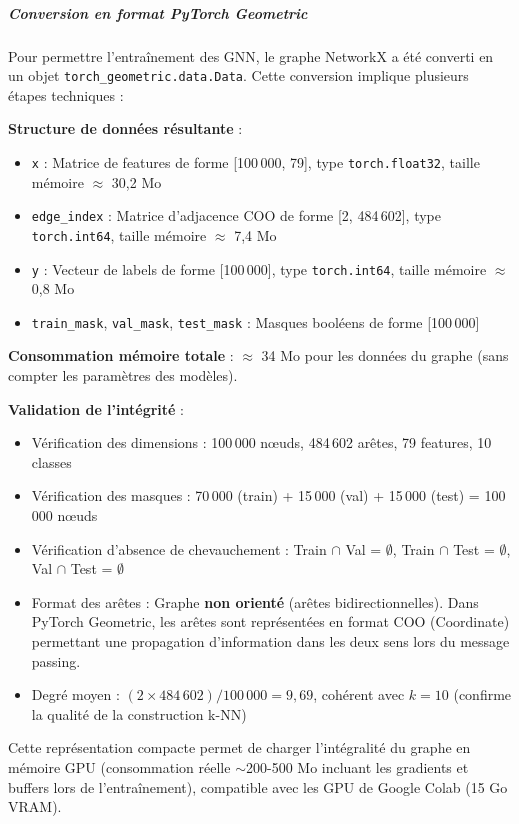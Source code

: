 ﻿\documentclass[11pt,a4paper]{article}
\begin{document}
\subparagraph{Conversion en format PyTorch Geometric}

Pour permettre l'entraînement des GNN, le graphe NetworkX a été converti en un objet \texttt{torch\_geometric.data.Data}. Cette conversion implique plusieurs étapes techniques :

\textbf{Structure de données résultante} :
\begin{itemize}
    \item \texttt{x} : Matrice de features de forme [100\,000, 79], type \texttt{torch.float32}, taille mémoire $\approx$ 30,2 Mo
    \item \texttt{edge\_index} : Matrice d'adjacence COO de forme [2, 484\,602], type \texttt{torch.int64}, taille mémoire $\approx$ 7,4 Mo
    \item \texttt{y} : Vecteur de labels de forme [100\,000], type \texttt{torch.int64}, taille mémoire $\approx$ 0,8 Mo
    \item \texttt{train\_mask}, \texttt{val\_mask}, \texttt{test\_mask} : Masques booléens de forme [100\,000]
\end{itemize}

\textbf{Consommation mémoire totale} : $\approx$ 34 Mo pour les données du graphe (sans compter les paramètres des modèles).

\textbf{Validation de l'intégrité} :
\begin{itemize}
    \item Vérification des dimensions : 100\,000 nœuds, 484\,602 arêtes, 79 features, 10 classes
    \item Vérification des masques : 70\,000 (train) + 15\,000 (val) + 15\,000 (test) = 100\,000 nœuds
    \item Vérification d'absence de chevauchement : Train $\cap$ Val = $\emptyset$, Train $\cap$ Test = $\emptyset$, Val $\cap$ Test = $\emptyset$
    \item Format des arêtes : Graphe \textbf{non orienté} (arêtes bidirectionnelles). Dans PyTorch Geometric, les arêtes sont représentées en format COO (Coordinate) permettant une propagation d'information dans les deux sens lors du message passing.
    \item Degré moyen : $(2 \times 484\,602) / 100\,000 = 9{,}69$, cohérent avec $k = 10$ (confirme la qualité de la construction k-NN)
\end{itemize}

Cette représentation compacte permet de charger l'intégralité du graphe en mémoire GPU (consommation réelle $\sim$200-500 Mo incluant les gradients et buffers lors de l'entraînement), compatible avec les GPU de Google Colab (15 Go VRAM).
\end{document}
